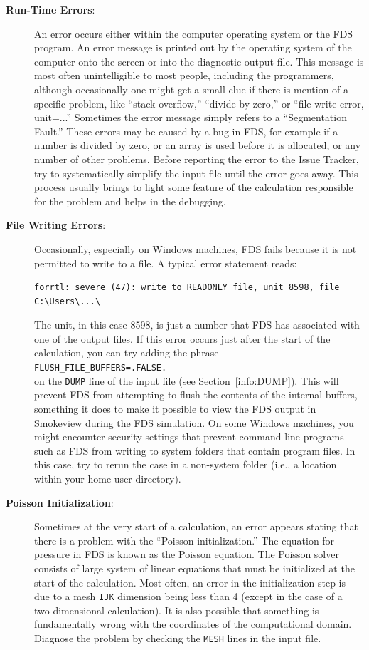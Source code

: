 \documentclass[11pt]{book}
\newcommand{\ct}{\tt\small}
\begin{document}
\begin{description}
\item[{\bf Run-Time Errors}:]
An error occurs either within the computer operating system or the
FDS program. An error message is printed out by the operating system of
the computer onto the screen or into the diagnostic output file. This
message is most often unintelligible to most people, including the programmers,
although occasionally one might get a small clue if there is mention of a specific problem,
like ``stack overflow,'' ``divide by zero,'' or ``file write error, unit=...''
Sometimes the error message simply refers to a ``Segmentation Fault.''
These errors may be caused by a bug in FDS, for example if a number is divided by zero,
or an array is used before it is allocated, or any number of other problems.
Before reporting the error to the Issue Tracker, try to systematically simplify the
input file until the error goes away. This process usually brings to light some feature of the
calculation responsible for the problem and helps in the debugging.

\item[{\bf File Writing Errors}:]
Occasionally, especially on Windows machines, FDS fails because it is not permitted to write to a file. A typical error statement reads:
\footnotesize
\begin{verbatim}
forrtl: severe (47): write to READONLY file, unit 8598, file C:\Users\...\
\end{verbatim} \normalsize
The unit, in this case 8598, is just a number that FDS has associated with one of the output files. If this error occurs just after the start of
the calculation, you can try adding the phrase \\ {\ct FLUSH\_FILE\_BUFFERS=.FALSE.} \\ on the {\ct DUMP} line of the input file (see Section~\ref{info:DUMP}).
This will prevent FDS from attempting to flush the contents of the internal buffers, something it does to make it possible to view the FDS output
in Smokeview during the FDS simulation. On some Windows machines, you might encounter
security settings that prevent command line programs such as FDS from writing to system
folders that contain program files. In this case, try to rerun the case in a non-system folder
(i.e., a location within your home user directory).

\item[{\bf Poisson Initialization}:]
Sometimes at the very start of a calculation, an error
appears stating that there is a problem with the ``Poisson initialization.'' The equation for
pressure in FDS is known as the Poisson equation. The Poisson solver consists of large system
of linear equations that must be initialized at the start of the calculation.
Most often, an error in the initialization step is due to a mesh {\ct IJK} dimension
being less than 4 (except in the case of a two-dimensional calculation). It is also possible that something is
fundamentally wrong with the coordinates of the computational domain. Diagnose the problem by
checking the {\ct MESH} lines in the input file.
\end{description}
\end{document}

